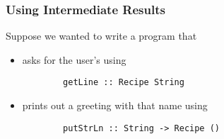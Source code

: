 \documentclass[letterpaper]{article}
\begin{document}
\subsubsection{Using Intermediate Results}
Suppose we wanted to write a program that 
\begin{itemize}
    \item asks for the user's  using 
    \begin{verbatim}
        getLine :: Recipe String\end{verbatim}
    \item prints out a greeting with that name using 
    \begin{verbatim}
        putStrLn :: String -> Recipe ()\end{verbatim}
\end{itemize}
\end{document}
